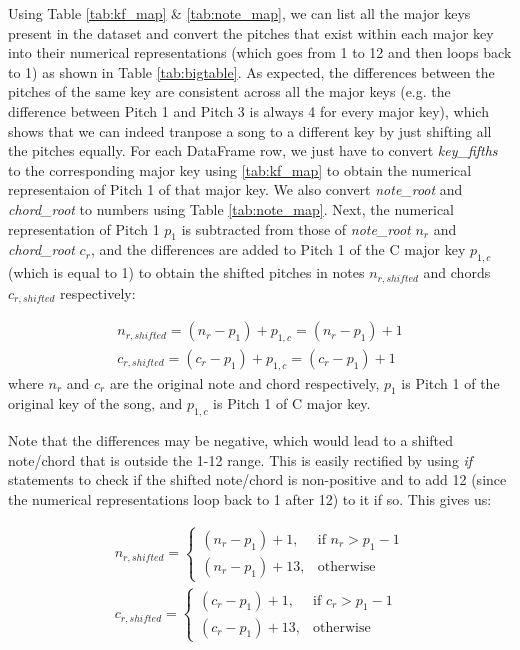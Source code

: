 Using Table \ref{tab:kf_map} \& \ref{tab:note_map}, we can list all the major keys present in the dataset and convert the pitches that exist within each major key into their numerical representations (which goes from 1 to 12 and then loops back to 1) as shown in Table \ref{tab:bigtable}. As expected, the differences between the pitches of the same key are consistent across all the major keys (e.g. the difference between Pitch 1 and Pitch 3 is always 4 for every major key), which shows that we can indeed tranpose a song to a different key by just shifting all the pitches equally. For each DataFrame row, we just have to convert \emph{key\_fifths} to the corresponding major key using \ref{tab:kf_map} to obtain the numerical representaion of Pitch 1 of that major key. We also convert \emph{note\_root} and \emph{chord\_root} to numbers using Table \ref{tab:note_map}. Next, the numerical representation of Pitch 1 $p_1$ is subtracted from those of \emph{note\_root} $n_r$ and \emph{chord\_root} $c_r$, and the differences are added to Pitch 1 of the C major key $p_{1,c}$ (which is equal to 1) to obtain the shifted pitches in notes $n_{r,shifted}$ and chords $c_{r,shifted}$ respectively: 

\begin{align} 
    \label{shift note 1}
    n_{r,shifted} = (n_r-p_1)+p_{1,c} = (n_r-p_1)+1\\
    \label{shift chord 2}
    c_{r,shifted} =(c_r-p_1)+p_{1,c} = (c_r-p_1)+1
\end{align}
where $n_r$ and $c_r$ are the original note and chord respectively, $p_1$ is Pitch 1 of the original key of the song, and $p_{1,c}$ is Pitch 1 of C major key.

Note that the differences may be negative, which would lead to a shifted note/chord that is outside the 1-12 range. This is easily rectified by using \emph{if} statements to check if the shifted note/chord is non-positive and to add 12 (since the numerical representations loop back to 1 after 12) to it if so. This gives us:

\begin{align}
    \label{shift note 2}
    n_{r,shifted}= 
\begin{cases}
    (n_r-p_1)+1,& \text{if } n_r > p_1-1\\
    (n_r-p_1)+13,              & \text{otherwise}
\end{cases}\\
c_{r,shifted}= 
\begin{cases}
    (c_r-p_1)+1,& \text{if } c_r > p_1-1\\
    (c_r-p_1)+13,              & \text{otherwise}
\end{cases}
\end{align}

